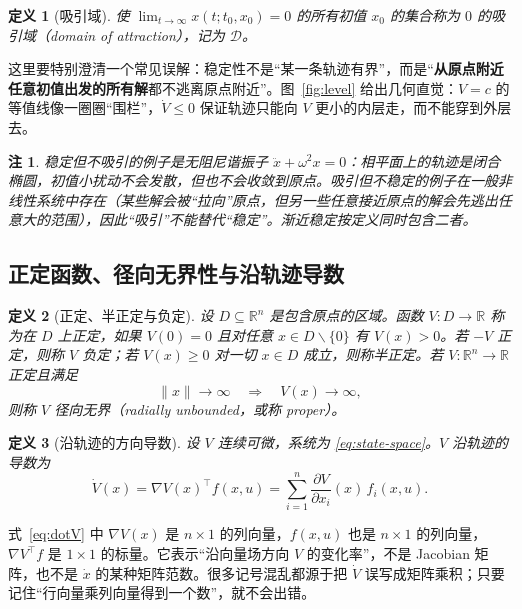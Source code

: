 \documentclass[11pt, a4paper, UTF8, fontset=none]{ctexart}
\theoremstyle{cnthm}
\newtheorem{definition}{定义}[section]
\newtheorem{remark}{注}[section]
\newcommand{\R}{\mathbb{R}}
\newcommand{\norm}[1]{\lVert #1\rVert}
\begin{document}
\begin{definition}[吸引域]
使 $\lim_{t\to\infty}x(t;t_0,x_0)=0$ 的所有初值 $x_0$ 的集合称为 $0$ 的吸引域（domain of attraction），记为 $\mathcal{D}$。
\end{definition}

这里要特别澄清一个常见误解：稳定性不是“某一条轨迹有界”，而是“\textbf{从原点附近任意初值出发的所有解}都不逃离原点附近”。图~\ref{fig:level} 给出几何直觉：$V=c$ 的等值线像一圈圈“围栏”，$\dot V\le0$ 保证轨迹只能向 $V$ 更小的内层走，而不能穿到外层去。

\begin{remark}
稳定但不吸引的例子是无阻尼谐振子 $\ddot x+\omega^2x=0$：相平面上的轨迹是闭合椭圆，初值小扰动不会发散，但也不会收敛到原点。吸引但不稳定的例子在一般非线性系统中存在（某些解会被“拉向”原点，但另一些任意接近原点的解会先逃出任意大的范围），因此“吸引”不能替代“稳定”。渐近稳定按定义同时包含二者。
\end{remark}

\subsection{正定函数、径向无界性与沿轨迹导数}

\begin{definition}[正定、半正定与负定]
设 $D\subseteq\R^n$ 是包含原点的区域。函数 $V:D\to\R$ 称为在 $D$ 上正定，如果 $V(0)=0$ 且对任意 $x\in D\backslash\{0\}$ 有 $V(x)>0$。若 $-V$ 正定，则称 $V$ 负定；若 $V(x)\ge0$ 对一切 $x\in D$ 成立，则称半正定。若 $V:\R^n\to\R$ 正定且满足
\begin{equation}
  \norm{x}\to\infty\quad\Longrightarrow\quad V(x)\to\infty,
  \label{eq:radial}
\end{equation}
则称 $V$ 径向无界（radially unbounded，或称 proper）。
\end{definition}

\begin{definition}[沿轨迹的方向导数]
设 $V$ 连续可微，系统为 \eqref{eq:state-space}。$V$ 沿轨迹的导数为
\begin{equation}
  \dot V(x)=\nabla V(x)^\top f(x,u)
  =\sum_{i=1}^{n}\frac{\partial V}{\partial x_i}(x)\,f_i(x,u).
  \label{eq:dotV}
\end{equation}
\end{definition}

\begin{warnbox}
式~\eqref{eq:dotV} 中 $\nabla V(x)$ 是 $n\times1$ 的列向量，$f(x,u)$ 也是 $n\times1$ 的列向量，$\nabla V^\top f$ 是 $1\times1$ 的标量。它表示“沿向量场方向 $V$ 的变化率”，不是 Jacobian 矩阵，也不是 $\dot x$ 的某种矩阵范数。很多记号混乱都源于把 $\dot V$ 误写成矩阵乘积；只要记住“行向量乘列向量得到一个数”，就不会出错。
\end{warnbox}
\end{document}
